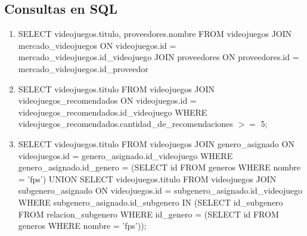 \documentclass[12pt]{article}
\begin{document}
\subsection{Consultas en SQL}
\begin{enumerate}
    \item SELECT videojuegos.titulo, proveedores.nombre FROM videojuegos JOIN mercado\_videojuegos ON videojuegos.id = mercado\_videojuegos.id\_videojuego JOIN proveedores ON \mbox{proveedores.id} = mercado\_videojuegos.id\_proveedor
    \item SELECT videojuegos.titulo FROM videojuegos JOIN videojuegos\_recomendados ON videojuegos.id = videojuegos\_recomendados.id\_videojuego WHERE \\videojuegos\_recomendados.cantidad\_de\_recomendaciones $>=$ 5;
    \item SELECT videojuegos.titulo FROM videojuegos JOIN genero\_asignado ON videojuegos.id = genero\_asignado.id\_videojuego WHERE genero\_asignado.id\_genero = \mbox{(SELECT} id FROM generos WHERE nombre = 'fps') UNION SELECT videojuegos.titulo FROM videojuegos JOIN subgenero\_asignado ON videojuegos.id = subgenero\_asignado.id\_videojuego WHERE subgenero\_asignado.id\_subgenero IN (SELECT id\_subgenero FROM relacion\_subgenero WHERE id\_genero = (SELECT id FROM generos WHERE nombre = 'fps'));
\end{enumerate}
\end{document}
